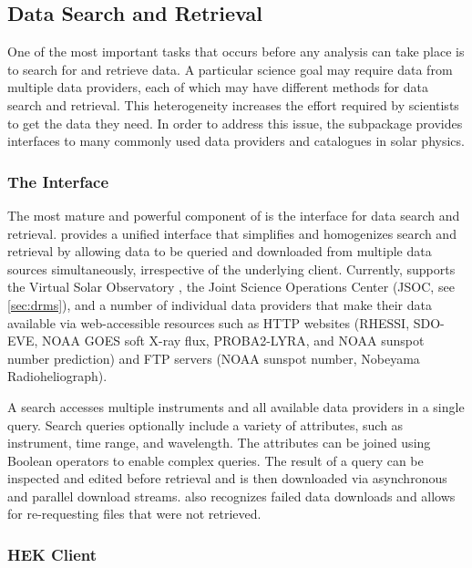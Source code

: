 
\subsection{Data Search and Retrieval}
\label{sec:fido}

One of the most important tasks that occurs before any analysis can take place is to search for and retrieve data.
A particular science goal may require data from multiple data providers, each of which may have different methods for data search and retrieval.
This heterogeneity increases the effort required by scientists to get the data they need.
In order to address this issue, the  subpackage provides interfaces to many commonly used data providers and catalogues in solar physics.

\subsubsection{The \Fido Interface}
\label{sec:fido}

The most mature and powerful component of  is the \Fido interface for data search and retrieval.
\Fido provides a unified interface that simplifies and homogenizes search and retrieval by allowing data to be queried and downloaded from multiple data sources simultaneously, irrespective of the underlying client.
Currently, \Fido supports the Virtual Solar Observatory \citep[VSO,][]{2009EM&P..104..315H}, the Joint Science Operations Center (JSOC, see \autoref{sec:drms}), and a number of individual data providers that make their data available via web-accessible resources such as HTTP websites (RHESSI, SDO-EVE, NOAA GOES soft X-ray flux, PROBA2-LYRA, and NOAA sunspot number prediction) and FTP servers (NOAA sunspot number, Nobeyama Radioheliograph).

A \Fido search accesses multiple instruments and all available data providers in a single query.
Search queries optionally include a variety of attributes, such as instrument, time range, and wavelength.
The attributes can be joined using Boolean operators to enable complex queries.
The result of a \Fido query can be inspected and edited before retrieval and is then downloaded via asynchronous and parallel download streams.
\Fido also recognizes failed data downloads and allows for re-requesting files that were not retrieved.

\subsubsection{HEK Client}
\label{sec:hek}

